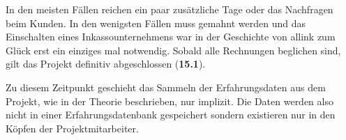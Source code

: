 In den meisten Fällen reichen ein paar zusätzliche Tage oder das Nachfragen beim 
Kunden. In den wenigsten Fällen muss gemahnt werden und das Einschalten eines 
Inkassounternehmens war in der Geschichte von allink zum Glück erst ein einziges 
mal notwendig. Sobald alle Rechnungen beglichen sind, gilt das Projekt definitiv 
abgeschlossen (\textbf{15.1}).

Zu diesem Zeitpunkt geschieht das Sammeln der Erfahrungsdaten aus dem Projekt,
wie in der Theorie beschrieben, nur implizit. Die Daten werden also nicht in 
einer Erfahrungsdatenbank gespeichert sondern existieren nur in den Köpfen
der Projektmitarbeiter.

\clearpage
